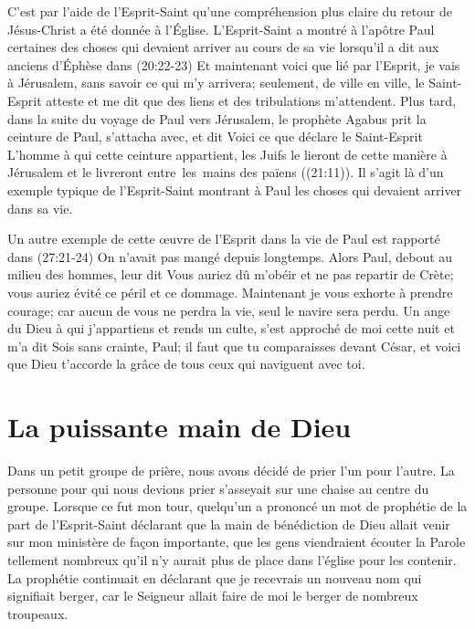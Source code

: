 C'est par l'aide de l'Esprit-Saint qu'une compréhension plus claire
 du retour de Jésus-Christ a été donnée à l'Église.
 L'Esprit-Saint a montré à l'apôtre Paul certaines des choses
 qui devaient arriver au cours de sa vie lorsqu'il a dit aux anciens d'Éphèse
 dans (20:22-23)\frcolon{}
 \Og Et maintenant voici que lié par l'Esprit, je vais à Jérusalem,
 sans savoir ce qui m'y arrivera; seulement, de ville en ville,
 le Saint-Esprit atteste et me dit que des liens
 et des tribulations m'attendent. \Fg{}
 Plus tard, dans la suite du voyage de Paul vers Jérusalem,
 le prophète Agabus prit la ceinture de Paul, s'attacha avec, et dit\frcolon{}
 \Og Voici ce que déclare le Saint-Esprit\frcolon{}
 L'homme à qui cette ceinture appartient, les Juifs le lieront
 de cette manière à Jérusalem et le livreront
 entre~les~mains des païens \Fg{} ((21:11)).
 Il s'agit là d'un exemple typique de l'Esprit-Saint montrant à Paul
 les choses qui devaient arriver dans sa vie.

Un autre exemple de cette œuvre de l'Esprit dans la vie de Paul
 est rapporté dans (27:21-24)\frcolon{}
 \Og On n'avait pas mangé depuis longtemps.
 Alors Paul, debout au milieu des hommes, leur dit\frcolon{}
 Vous auriez dû m'obéir et ne pas repartir de Crète;
 vous auriez évité ce péril et ce dommage.
 Maintenant je vous exhorte à prendre courage;
 car aucun de vous ne perdra la vie, seul le navire sera perdu.
 Un ange du Dieu à qui j'appartiens et rends un culte,
 s'est approché de moi cette nuit et m'a dit\frcolon{}
 Sois sans crainte, Paul; il faut que tu comparaisses devant César,
 et voici que Dieu t'accorde la grâce de tous ceux qui naviguent avec toi. \Fg{}


\section{La puissante main de Dieu}

Dans un petit groupe de prière, nous avons décidé de prier
 l'un pour l'autre.
 La personne pour qui nous devions prier s'asseyait sur une chaise
 au centre du groupe. Lorsque ce fut mon tour,
 quelqu'un a prononcé un mot de prophétie de la part de l'Esprit-Saint
 déclarant que la main de bénédiction de Dieu allait venir
 sur mon ministère de façon importante, que les gens viendraient écouter
 la Parole tellement nombreux qu'il n'y aurait plus de place dans l'église
 pour les contenir.
 La prophétie continuait en déclarant que je recevrais un nouveau nom
 qui signifiait berger, car le Seigneur allait faire de moi le berger
 de nombreux troupeaux.

